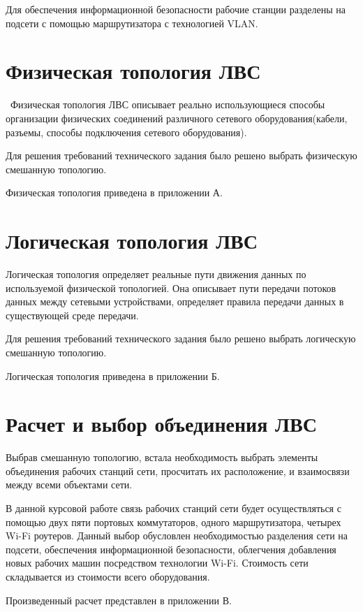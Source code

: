 \documentclass[russian,utf8,pointsection,simple,14pt]{eskdtext}
\begin{document}
Для обеспечения информационной безопасности рабочие станции разделены на подсети с помощью маршрутизатора с технологией VLAN.

\newpage
	\section{Физическая топология ЛВС}
\
Физическая топология ЛВС описывает реально использующиеся способы организации физических соединений различного сетевого оборудования(кабели, разъемы, способы подключения сетевого оборудования).

Для решения требований технического задания было решено выбрать физическую смешанную топологию.

Физическая топология приведена в приложении А.
\newpage

	\section{Логическая топология ЛВС}

Логическая топология определяет реальные пути движения данных по используемой физической топологией. Она описывает пути передачи потоков данных между сетевыми устройствами, определяет правила передачи данных в существующей среде передачи.

Для решения требований технического задания было решено выбрать логическую смешанную топологию.

Логическая топология приведена в приложении Б.

\newpage

\section{Расчет и выбор объединения ЛВС}
Выбрав смешанную топологию, встала необходимость выбрать элементы объединения рабочих станций сети, просчитать их расположение, и взаимосвязи между всеми объектами сети.

В данной курсовой работе связь рабочих станций сети будет осуществляться с помощью двух пяти портовых коммутаторов, одного маршрутизатора, четырех Wi-Fi роутеров. Данный выбор обусловлен необходимостью разделения сети на подсети, обеспечения информационной безопасности, облегчения добавления новых рабочих машин посредством технологии Wi-Fi. Стоимость сети складывается из стоимости всего оборудования.

Произведенный расчет представлен в приложении В.
\end{document}
